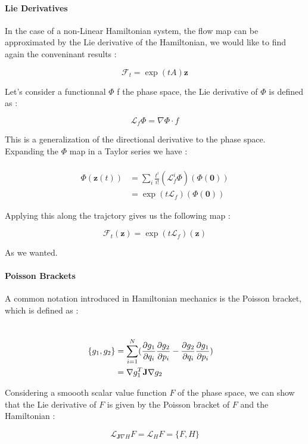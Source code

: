 \documentclass[ansiapaper]{report}
\begin{document}
\begin{multicols}{3}
	\paragraph*{Lie Derivatives}

	In the case of a non-Linear Hamiltonian system, the flow map can be approximated by the Lie derivative of the Hamiltonian, we would like to find again the conveninant results :

	$$ \mathcal{F}_t = \exp(tA)\textbf{z}$$

	Let's consider a functionnal $\Phi$ f the phase space, the Lie derivative of $\Phi$ is defined as :

	$$ \mathcal{L}_f \Phi = \nabla \Phi \cdot f$$

	This is a generalization of the directional derivative to the phase space. Expanding the $\Phi$ map in a Taylor series we have :

	\begin{align*}
		\\ \Phi(\textbf{z}(t)) &= \sum_i \frac{t^i}{i!}(\mathcal{L}_f^i \Phi)( \Phi(\textbf{0} ))
		\\ &= \exp(t\mathcal{L}_f)(\Phi(\textbf{0}) )
	\end{align*}

	Applying this along the trajctory gives us the following map :

	$$\mathcal{F}_t(\textbf{z} ) = \exp(t\mathcal{L}_f)(\textbf{z})$$

	As we wanted.

	\paragraph*{Poisson Brackets}

	A common notation introduced in Hamiltonian mechanics is the Poisson bracket, which is defined as :

	\begin{align*}
		\\ \{g_1, g_2 \} &= \sum_{i = 1}^N (\pdv{g_1}{q_i}\pdv{g_2}{p_i} - \pdv{g_2}{q_i}\pdv{g_1}{p_i})
		\\ &= \nabla g_1^T \textbf{J} \nabla g_2
	\end{align*}

	Considering a smoooth scalar value function $F$ of the phase space, we can show that the Lie derivative of $F$ is given by the Poisson bracket of $F$ and the Hamiltonian :

	$$ \mathcal{L}_{\textbf{J} \nabla H} F = \mathcal{L}_H F = \{F, H\}$$


\end{multicols}
\end{document}
